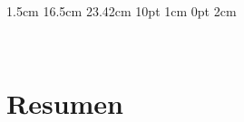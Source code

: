 \documentclass[a4paper,12pt]{article}
\begin{document}

\setmargins{2.5cm}       %
{1.5cm}                        %
{16.5cm}                      %
{23.42cm}                    %
{10pt}                           %
{1cm}                           %
{0pt}                             %
{2cm}                           %













%
%


%








\

\section*{Resumen}
\end{document}
